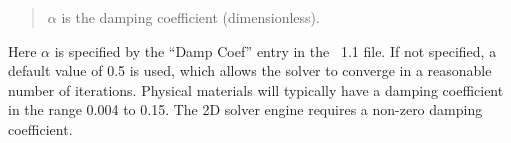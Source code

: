 \begin{itemize}
{\begin{quotation}
  $\alpha$           is the damping coefficient (dimensionless).
\end{quotation}
} %
    Here $\alpha$ is
  specified by the ``Damp Coef'' entry in the \MIF~1.1 file.  If not
  specified, a default value of 0.5 is used, which allows the solver to
  converge in a reasonable number of iterations.  Physical materials
  will typically have a damping coefficient in the range 0.004 to
  0.15.  The 2D solver engine
   requires a
  non-zero damping coefficient.
\end{itemize}

